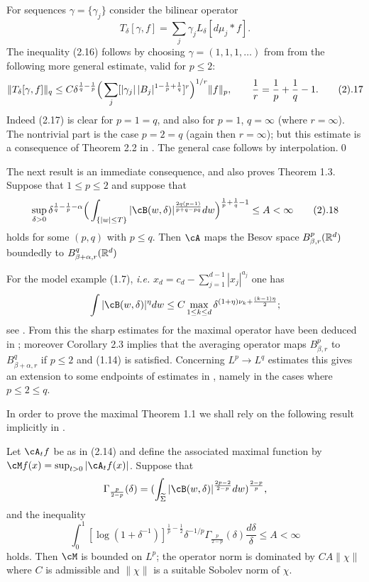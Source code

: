 For  sequences $\gamma =\{\gamma_j\}$ consider the bilinear operator
$$
T_\delta[\gamma,f]=\sum_j \gamma_j L_\delta[d\mu_j*f].
$$
The inequality (2.16) follows by choosing $\gamma=(1,1,1,\dots)$ from
from the following more general  estimate, valid for $p\le 2$:
$$
\|T_\delta[\gamma,f]\|_q\le C\delta^{\frac 1q-\frac 1p}
\Big(\sum_j [|\gamma_j|\,
|B_j|^{1-\frac 1p+\frac 1q}]^{r}
\Big)^{1/r}
\|f\|_p, \qquad\frac 1r=\frac 1p+\frac 1q-1.
\tag 2.17
$$
Indeed (2.17) is clear  for $p=1=q$, and also for $p=1$, $q=\infty$ 
(where $r=\infty$).
The nontrivial part is the case  $p=2=q$ (again then $r=\infty$); but this 
estimate  is a consequence of Theorem 2.2 in \cite{18}.
The general case follows by interpolation.\qed
\enddemo

The next result is an immediate consequence, and  also proves Theorem 1.3.
Suppose that $1\le p\le 2$ and suppose that 
$$\sup_{\delta>0} \delta^{\frac 1q-\frac 1p-\alpha}
\Big(\int_{\{|w|\le T\}}|\cB(w,\delta)|^{\frac{2q(p-1)}{p+q-pq}}dw
\Big)^{\frac 1p+\frac 1q-1}\le A<\infty
\tag 2.18$$
holds for some $(p,q)$ with $p\le q$.
Then $\cA$ maps the Besov space $B^p_{\beta,r}(\Bbb R^d)$ boundedly to 
$B^q_{\beta+\alpha,r}(\Bbb R^d)$
\endproclaim

For the model example (1.7), {\it i.e.}
$x_d=c_d-\sum_{j=1}^{d-1}|x_j|^{a_j}$ one has
$$
\int|\cB(w,\delta)|^\eta dw
\le C \max_{1\le k\le d} \delta^{(1+\eta)\nu_k+\frac{(k-1)\eta}2};
$$
see  \cite{18, formula (5.2)}. From this  the sharp estimates 
for the maximal 
operator have been deduced in \cite{18}; moreover
Corollary 2.3 implies that
the averaging operator maps 
 $B^p_{\beta,r}$ to 
$B^q_{\beta+\alpha,r}$ if  $p\le 2$ and (1.14) is satisfied.
Concerning $L^p\to L^q$ estimates this  gives an extension to some 
endpoints of estimates in \cite{}, namely in the cases where
 $p\le 2\le q$.
\endremark

In order to prove the maximal Theorem 1.1 we shall rely on the following
 result implicitly in \cite{18}.

Let $\cA_t f$ be as in (2.14) and define the associated maximal function
 by $\cM f(x) =\sup_{t>0}|\cA_t f(x)|$.
Suppose that
$$\Gamma_{\frac{p}{2-p}}(\delta)=
(\int_\tSi|\cB(w,\delta)|^{\frac{2p-2}{2-p}}dw)^{\frac{2-p}{p}},
$$
and the inequality
$$
\int_0^1
[\log(1+\delta^{-1})]^{\frac 1p-\frac 12}\delta^{-1/p}
\Gamma_{\frac{p}{2-p}}(\delta)\frac {d\delta}{\delta}
\le A<\infty
$$
holds.
Then
$\cM$ is bounded on $L^p$;  the operator norm is dominated 
by $CA\|\chi\|$ where $C$ is admissible and $\|\chi\|$ is a 
suitable Sobolev norm of $\chi$.
\endproclaim

